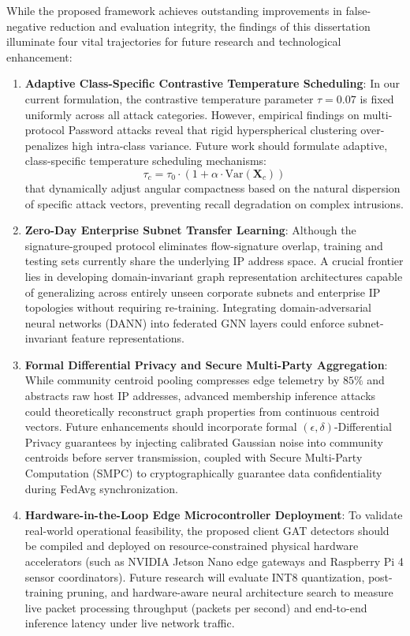 \documentclass[12pt,a4paper]{report}
\begin{document}
While the proposed framework achieves outstanding improvements in false-negative reduction and evaluation integrity, the findings of this dissertation illuminate four vital trajectories for future research and technological enhancement:
\begin{enumerate}
    \item \textbf{Adaptive Class-Specific Contrastive Temperature Scheduling}: In our current formulation, the contrastive temperature parameter $\tau = 0.07$ is fixed uniformly across all attack categories. However, empirical findings on multi-protocol Password attacks reveal that rigid hyperspherical clustering over-penalizes high intra-class variance. Future work should formulate adaptive, class-specific temperature scheduling mechanisms:
    \begin{equation}
    \tau_c = \tau_0 \cdot \left( 1 + \alpha \cdot \text{Var}(\boldsymbol{X}_c) \right)
    \end{equation}
    that dynamically adjust angular compactness based on the natural dispersion of specific attack vectors, preventing recall degradation on complex intrusions.
    \item \textbf{Zero-Day Enterprise Subnet Transfer Learning}: Although the signature-grouped protocol eliminates flow-signature overlap, training and testing sets currently share the underlying IP address space. A crucial frontier lies in developing domain-invariant graph representation architectures capable of generalizing across entirely unseen corporate subnets and enterprise IP topologies without requiring re-training. Integrating domain-adversarial neural networks (DANN) into federated GNN layers could enforce subnet-invariant feature representations.
    \item \textbf{Formal Differential Privacy and Secure Multi-Party Aggregation}: While community centroid pooling compresses edge telemetry by $85\%$ and abstracts raw host IP addresses, advanced membership inference attacks could theoretically reconstruct graph properties from continuous centroid vectors. Future enhancements should incorporate formal $(\epsilon, \delta)$-Differential Privacy guarantees by injecting calibrated Gaussian noise into community centroids before server transmission, coupled with Secure Multi-Party Computation (SMPC) to cryptographically guarantee data confidentiality during FedAvg synchronization.
    \item \textbf{Hardware-in-the-Loop Edge Microcontroller Deployment}: To validate real-world operational feasibility, the proposed client GAT detectors should be compiled and deployed on resource-constrained physical hardware accelerators (such as NVIDIA Jetson Nano edge gateways and Raspberry Pi 4 sensor coordinators). Future research will evaluate INT8 quantization, post-training pruning, and hardware-aware neural architecture search to measure live packet processing throughput (packets per second) and end-to-end inference latency under live network traffic.
\end{enumerate}
\end{document}
